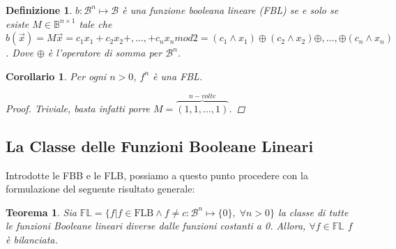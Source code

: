 \documentclass[12pt,a4paper,openright]{report}
\newcommand*\xor{\mathbin{\oplus}}
\newtheorem{mydef}{Definizione}[chapter]
\newtheorem*{mycor}{Corollario}
\newtheorem{mythm}{Teorema}[chapter]
\begin{document}
\begin{mydef}
$b:\mathcal{B}^n \mapsto \mathcal{B}$ è una funzione booleana lineare (FBL) se e solo se esiste $M \in \mathbb{B}^{n \times 1}$ tale che $b(\vec{x})=M\vec{x}=c_1x_1+c_2x_2+,...,+c_nx_n mod 2=(c_1\land{x_1})\xor(c_2\land{x_2})\xor,...,\xor(c_n\land{x_n})$. Dove $\xor$
è l'operatore di somma per $\mathcal{B}^n$. 
\end{mydef}
\begin{mycor}
    Per ogni $n>0$, $f^n$ è una FBL.
    \begin{proof}
        Triviale, basta infatti porre $M=\overbrace{(1,1,...,1)}^{n-volte}$.
    \end{proof}
\end{mycor}

\subsection{La Classe delle Funzioni Booleane Lineari}
Introdotte le FBB e le FLB, possiamo a questo punto procedere con la formulazione del seguente risultato generale:
\begin{mythm}
    Sia $\mathbb{FL}=\{f|f\in\text{FLB} \land f \neq c:\mathcal{B}^n\mapsto\{0\},\;\forall n > 0\}$ la classe di tutte le funzioni Booleane lineari
    diverse dalle funzioni costanti a 0. Allora, $\forall f\in \mathbb{FL}$ $f$ è bilanciata.
\end{mythm}
\end{document}
